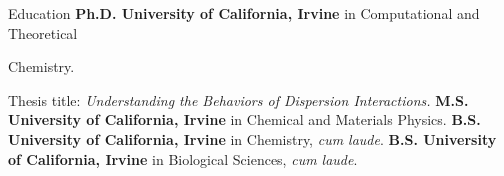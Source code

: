 \begin{rubric}{Education}
  \textbf{Ph.D. University of California, Irvine} in Computational and Theoretical

  Chemistry.
  \par Thesis title: \emph{Understanding the Behaviors of Dispersion Interactions.}
%
  \textbf{M.S. University of California, Irvine} in Chemical and Materials Physics.
%
  \textbf{B.S. University of California, Irvine} in Chemistry, \textit{cum laude}.
%
  \textbf{B.S. University of California, Irvine} in Biological Sciences, \textit{cum laude}.
\end{rubric}
